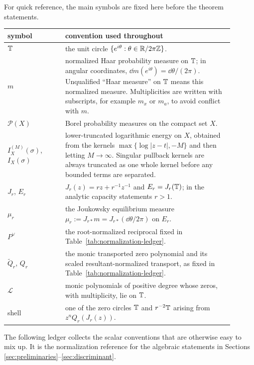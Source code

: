 For quick reference, the main symbols are fixed here before the theorem statements.
\begin{center}
\small
\renewcommand{\arraystretch}{1.18}
\begin{tabular}{p{0.23\linewidth}|p{0.67\linewidth}}
\hline
symbol & convention used throughout \\
\hline
\(\mathbb{T}\) & the unit circle \(\{e^{i\theta}:\theta\in\mathbb{R}/2\pi\mathbb{Z}\}\). \\
\(m\) & normalized Haar probability measure on \(\mathbb{T}\); in angular coordinates, \(\dd m(e^{i\theta})=\dd\theta/(2\pi)\).  Unqualified ``Haar measure'' on \(\mathbb{T}\) means this normalized measure.  Multiplicities are written with subscripts, for example \(m_x\) or \(m_a\), to avoid conflict with \(m\). \\
\(\mathcal P(X)\) & Borel probability measures on the compact set \(X\). \\
\(I_X^{(M)}(\sigma)\), \(I_X(\sigma)\) & lower-truncated logarithmic energy on \(X\), obtained from the kernels \(\max\{\log|z-t|,-M\}\) and then letting \(M\to\infty\).  Singular pullback kernels are always truncated as one whole kernel before any bounded terms are separated. \\
\(J_r\), \(E_r\) & \(J_r(z)=rz+r^{-1}z^{-1}\) and \(E_r=J_r(\mathbb{T})\); in the analytic capacity statements \(r>1\). \\
\(\mu_r\) & the Joukowsky equilibrium measure \(\mu_r:=J_{r\ast}m=J_{r\ast}(\dd\theta/2\pi)\) on \(E_r\). \\
\(P^\vee\) & the root-normalized reciprocal fixed in Table~\ref{tab:normalization-ledger}. \\
\(\widetilde Q_r\), \(Q_r\) & the monic transported zero polynomial and its scaled resultant-normalized transport, as fixed in Table~\ref{tab:normalization-ledger}. \\
\(\mathcal L\) & monic polynomials of positive degree whose zeros, with multiplicity, lie on \(\mathbb{T}\). \\
shell & one of the zero circles \(\mathbb{T}\) and \(r^{-2}\mathbb{T}\) arising from \(z^nQ_r(J_r(z))\). \\
\hline
\end{tabular}
\end{center}
The following ledger collects the scalar conventions that are otherwise easy to mix up.  It is the normalization reference for the algebraic statements in Sections \ref{sec:preliminaries}--\ref{sec:discriminant}.

